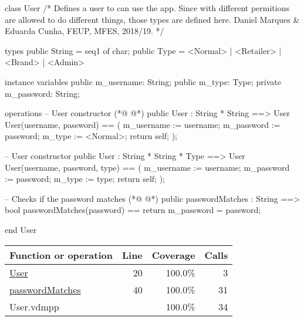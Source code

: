 \begin{vdmpp}[breaklines=true]
class User
/*
  Defines a user to can use the app.
  Since with different permitions are allowed to do different things,
  those types are defined here.
  Daniel Marques & Eduarda Cunha, FEUP, MFES, 2018/19.
*/

 types
  public String = seq1 of char;
  public Type = <Normal> | <Retailer> | <Brand> | <Admin>
 
 instance variables
  public m_username: String;
  public m_type: Type;
  private m_password: String;
 
 operations
  -- User constructor
(*@
\label{User:20}
@*)
  public User : String * String ==> User
  User(username, password) ==
  (
   m_username := username;
   m_password := password;
   m_type := <Normal>;
   return self;
  );
  
  -- User constructor
  public User : String * String * Type ==> User
  User(username, password, type) ==
  (
   m_username := username;
   m_password := password;
   m_type := type;
   return self;
  );
  
  -- Checks if the password matches
(*@
\label{passwordMatches:40}
@*)
  public passwordMatches : String ==> bool
  passwordMatches(password) == return m_password = password;
  
end User
\end{vdmpp}
\bigskip
\begin{longtable}{|l|r|r|r|}
\hline
Function or operation & Line & Coverage & Calls \\
\hline
\hline
\hyperref[User:20]{User} & 20&100.0\% & 3 \\
\hline
\hyperref[passwordMatches:40]{passwordMatches} & 40&100.0\% & 31 \\
\hline
\hline
User.vdmpp & & 100.0\% & 34 \\
\hline
\end{longtable}

